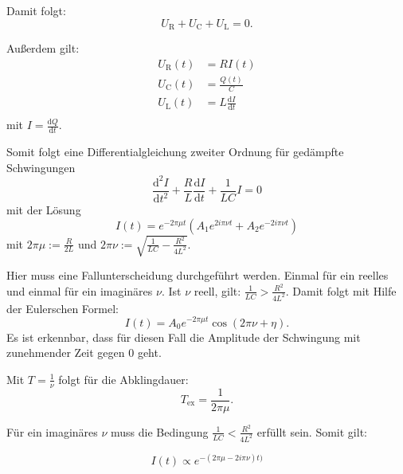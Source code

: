 Damit folgt:
\begin{equation}
  U_{\mathrm R} + U_{\mathrm C} + U_{\mathrm L} = 0.
\end{equation}

Außerdem gilt:
\begin{align}
U_{\mathrm R}(t) &= R I(t) \\
U_{\mathrm C}(t) &= \frac{Q(t)}{C} \\
U_{\mathrm L}(t) &= L \frac{\mathrm{d}I}{\mathrm{d}t}\\
\end{align}
mit $I = \frac{\mathrm{d}Q}{\mathrm{d}t}$.

Somit folgt eine Differentialgleichung zweiter Ordnung für gedämpfte Schwingungen
\begin{equation}
  \label{eqn:dgl}
  \frac{\mathrm{d}^2 I}{\mathrm{d}t^2} + \frac{R}{L} \frac{\mathrm{d}I}{\mathrm{d}t} + \frac{1}{LC} I = 0
\end{equation}
 mit der Lösung
 \begin{equation}
   I(t) = e^{-2\pi \mu t}(A_{1} e^{2i\pi \nu t} + A_{2} e^{-2i\pi \nu t})
\end{equation}
mit $2\pi \mu := \frac{R}{2L}$ und $2\pi \nu := \sqrt{\frac{1}{LC} - \frac{R^2}{4L^2}}$.

Hier muss eine Fallunterscheidung durchgeführt werden. Einmal für ein reelles und einmal für ein imaginäres $\nu$.
Ist $\nu$ reell, gilt: $\frac{1}{LC} > \frac{R^2}{4L^2}$. Damit folgt mit Hilfe der Eulerschen Formel:
\begin{equation}
  I(t) = A_0 e^{-2\pi \mu t} \cos(2\pi\nu + \eta).
\end{equation}
Es ist erkennbar, dass für diesen Fall die Amplitude der Schwingung mit zunehmender Zeit gegen 0 geht.

Mit $T = \frac{1}{\nu}$ folgt für die Abklingdauer:
\begin{equation}
  T_{\mathrm{ex}} = \frac{1}{2\pi\mu}.
\end{equation}


Für ein imaginäres $\nu$ muss die Bedingung $\frac{1}{LC} < \frac{R^2}{4L^2}$ erfüllt sein.
Somit gilt:

\begin{equation}
  I(t) \propto e^{-(2\pi\mu -2i\pi\nu)t)}
\end{equation}

